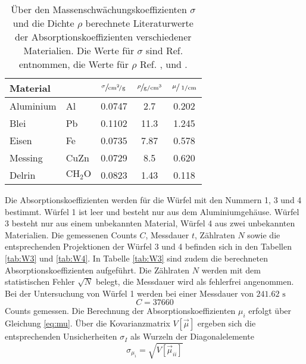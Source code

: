 \begin{table}[h]
    \centering
    \caption{Über den Massenschwächungskoeffizienten $\sigma$ und die Dichte $\rho$ berechnete Literaturwerte der 
    Absorptionskoeffizienten verschiedener Materialien. Die Werte für $\sigma$ sind Ref. \cite{xcom} entnommen, die Werte für 
    $\rho$ Ref. \cite{rsc}, \cite{delrin} und \cite{chemie}.}
    \label{tab:literatur}
    \begin{tabular}{l l S[table-format=1.4] S[table-format=2.2] S[table-format=1.3]}
        \toprule
        {Material} & {} & {$\sfrac{\sigma}{\si{\centi\meter\squared\per\gram}}$} & {$\sfrac{\rho}{\si{\gram\per\cubic\centi\meter}}$} & {$\sfrac{\mu}{\ \si{\per\centi\meter}}$}\\
        \midrule
        {Aluminium} & {Al}                    & 0.0747 & 2.7  & 0.202 \\
        {Blei}      & {Pb}                    & 0.1102 & 11.3 & 1.245 \\
        {Eisen}     & {Fe}                    & 0.0735 & 7.87 & 0.578 \\
        {Messing}   & {CuZn}                  & 0.0729 & 8.5  & 0.620 \\
        {Delrin}    & {$\text{CH}_2\text{O}$} & 0.0823 & 1.43 & 0.118 \\
        \bottomrule
    \end{tabular}
\end{table}
\FloatBarrier
\noindent
Die Absorptionskoeffizienten werden für die Würfel mit den Nummern 1, 3 und 4 bestimmt. Würfel 1 ist leer und besteht nur aus dem Aluminiumgehäuse.
Würfel 3 besteht nur aus einem unbekannten Material, Würfel 4 aus zwei unbekannten Materialien. 
Die gemessenen Counts $C$, Messdauer $t$, Zählraten $N$ sowie die entsprechenden Projektionen der Würfel 3 und 4 
befinden sich in den Tabellen \ref{tab:W3} und \ref{tab:W4}. In Tabelle \ref{tab:W3} sind zudem die berechneten Absorptionskoeffizienten
aufgeführt. Die Zählraten $N$ werden mit dem statistischen Fehler $\sqrt{N}$
belegt, die Messdauer wird als fehlerfrei angenommen.
Bei der Untersuchung von Würfel 1 werden bei einer Messdauer von $241.62 \text{ s}$ 
\begin{equation*}
    C = 37660
\end{equation*}
Counts gemessen.  
Die Berechnung der Absorptionskoeffizienten $\mu_i$ erfolgt über Gleichung \ref{eq:mu}. Über die Kovarianzmatrix $V[\vec{\mu}]$ ergeben sich die entsprechenden 
Unsicherheiten $\sigma_I$ als Wurzeln der Diagonalelemente
\begin{equation*}
    \sigma_{\mu_i} = \sqrt{V[\vec{\mu}_{ii}]} 
\end{equation*}
